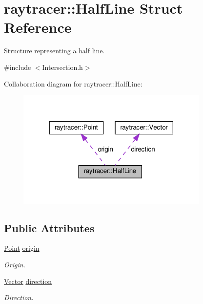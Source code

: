 \hypertarget{structraytracer_1_1HalfLine}{}\section{raytracer\+:\+:Half\+Line Struct Reference}
\label{structraytracer_1_1HalfLine}


Structure representing a half line.  




{\ttfamily \#include $<$Intersection.\+h$>$}



Collaboration diagram for raytracer\+:\+:Half\+Line\+:
\nopagebreak
\begin{figure}[H]
\begin{center}
\leavevmode
\includegraphics[width=270pt]{structraytracer_1_1HalfLine__coll__graph}
\end{center}
\end{figure}
\subsection*{Public Attributes}
\begin{DoxyCompactItemize}
\item 
\mbox{\label{structraytracer_1_1HalfLine_a905cfe4a35c3a249af473cb348061d15}} 
\hyperlink{classraytracer_1_1Point}{Point} \hyperlink{structraytracer_1_1HalfLine_a905cfe4a35c3a249af473cb348061d15}{origin}
\begin{DoxyCompactList}\small\item\em Origin. \end{DoxyCompactList}\item 
\mbox{\label{structraytracer_1_1HalfLine_abe4077c13e9fa9706d326d9276293942}} 
\hyperlink{classraytracer_1_1Vector}{Vector} \hyperlink{structraytracer_1_1HalfLine_abe4077c13e9fa9706d326d9276293942}{direction}
\begin{DoxyCompactList}\small\item\em Direction. \end{DoxyCompactList}\end{DoxyCompactItemize}


